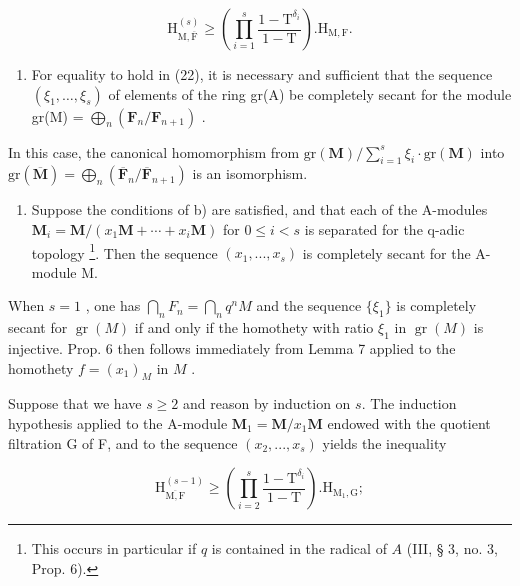 \[
\mathrm{H} _ {\mathrm{M}, \overline {{\mathrm{F}}}} ^ {(s)} \geqslant \left(\prod_ {i = 1} ^ {s} \frac {1 - \mathrm{T} ^ {\delta_ {i}}}{1 - \mathrm{T}}\right). \mathrm{H} _ {\mathrm{M}, \mathrm{F}}.\tag{22}
\]

\begin{enumerate}
\def\labelenumi{\alph{enumi})}
\setcounter{enumi}{1}
\tightlist
\item
  For equality to hold in (22), it is necessary and sufficient that the sequence \((\xi_1, \ldots, \xi_s)\) of elements of the ring gr(A) be completely secant for the module gr(M) = \(\bigoplus_{n} (\mathbf{F}_n / \mathbf{F}_{n+1})\) .
\end{enumerate}

In this case, the canonical homomorphism from \(\mathrm{gr}(\mathbf{M}) / \sum_{i=1}^{s} \xi_i \cdot \mathrm{gr}(\mathbf{M})\) into \(\mathrm{gr}(\overline{\mathbf{M}}) = \bigoplus_{n} (\overline{\mathbf{F}}_n / \overline{\mathbf{F}}_{n+1})\) is an isomorphism.

\begin{enumerate}
\def\labelenumi{\alph{enumi})}
\setcounter{enumi}{2}
\tightlist
\item
  Suppose the conditions of b) are satisfied, and that each of the A-modules \(\mathbf{M}_{i} = \mathbf{M}/(x_{1}\mathbf{M} + \cdots + x_{i}\mathbf{M})\) for \(0 \leqslant i < s\) is separated for the q-adic topology \footnote{This occurs in particular if \(q\) is contained in the radical of \(A\) (III, § 3, no. 3, Prop. 6).}. Then the sequence \((x_{1}, ..., x_{s})\) is completely secant for the A-module M.
\end{enumerate}

When \(s = 1\) , one has \(\bigcap_{n} F_{n} = \bigcap_{n} q^{n} M\) and the sequence \(\{\xi_{1}\}\) is completely secant for \(\operatorname{gr}(M)\) if and only if the homothety with ratio \(\xi_{1}\) in \(\operatorname{gr}(M)\) is injective. Prop. 6 then follows immediately from Lemma 7 applied to the homothety \(f = (x_{1})_{M}\) in \(M\) .

Suppose that we have \(s \geqslant 2\) and reason by induction on \(s\). The induction hypothesis applied to the A-module \(\mathbf{M}_{1} = \mathbf{M}/x_{1}\mathbf{M}\) endowed with the quotient filtration G of F, and to the sequence \((x_{2}, ..., x_{s})\) yields the inequality

\[
\mathrm{H} _ {\overline {{\mathrm{M,F}}}} ^ {(s - 1)} \geqslant \left(\prod_ {i = 2} ^ {s} \frac {1 - \mathrm{T} ^ {\delta_ {i}}}{1 - \mathrm{T}}\right). \mathrm{H} _ {\mathrm{M} _ {1}, \mathrm{G}};\tag{23}
\]

